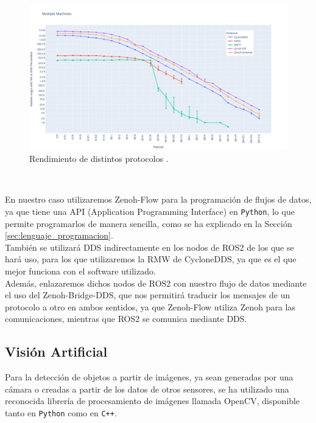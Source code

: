 \begin{figure} [h!]
  \begin{center}
    \includegraphics[width=15cm]{figs/zenoh_performance}
  \end{center}
  \caption{Rendimiento de distintos protocolos \cite{zenoh_performance}.}
  \label{fig:zenoh_performance}
\end{figure}\

En nuestro caso utilizaremos Zenoh-Flow para la programación de flujos de datos,
ya que tiene una API (Application Programming Interface) en \texttt{Python}, lo
que permite programarlos de manera sencilla, como se ha explicado en la Sección
\ref{sec:lenguaje_programacion}.
\\

También se utilizará DDS indirectamente en los nodos de ROS2 de los que se hará
uso, para los que utilizaremos la RMW de CycloneDDS, ya que es el que mejor
funciona con el software utilizado.
\\

Además, enlazaremos dichos nodos de ROS2 con nuestro flujo de datos mediante el
uso del Zenoh-Bridge-DDS, que nos permitirá traducir los mensajes de un
protocolo a otro en ambos sentidos, ya que Zenoh-Flow utiliza Zenoh para las
comunicaciones, mientras que ROS2 se comunica mediante DDS.
\\


\subsection{Visión Artificial}
\label{sec:vision_artificial}

Para la detección de objetos a partir de imágenes, ya sean generadas por una
cámara o creadas a partir de los datos de otros sensores, se ha utilizado una
reconocida librería de procesamiento de imágenes llamada OpenCV, disponible
tanto en \texttt{Python} como en \texttt{C++}.
\\

